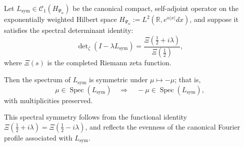 \begin{lemma}
\label{lem:spectral-symmetry-lsym}
Let \( L_{\mathrm{sym}} \in \mathcal{C}_1(H_{\Psi_\alpha}) \) be the canonical compact, self-adjoint operator on the exponentially weighted Hilbert space \( H_{\Psi_\alpha} := L^2(\mathbb{R}, e^{\alpha |x|} dx) \), and suppose it satisfies the spectral determinant identity:
\[
\det\nolimits_{\zeta}(I - \lambda L_{\mathrm{sym}}) = \frac{\Xi\left( \tfrac{1}{2} + i\lambda \right)}{\Xi\left( \tfrac{1}{2} \right)},
\]
where \( \Xi(s) \) is the completed Riemann zeta function.

Then the spectrum of \( L_{\mathrm{sym}} \) is symmetric under \( \mu \mapsto -\mu \); that is,
\[
\mu \in \operatorname{Spec}(L_{\mathrm{sym}}) \quad \Longrightarrow \quad -\mu \in \operatorname{Spec}(L_{\mathrm{sym}}),
\]
with multiplicities preserved.

\medskip
\noindent
This spectral symmetry follows from the functional identity \( \Xi(\tfrac{1}{2} + i\lambda) = \Xi(\tfrac{1}{2} - i\lambda) \), and reflects the evenness of the canonical Fourier profile associated with \( L_{\mathrm{sym}} \).
\end{lemma}
